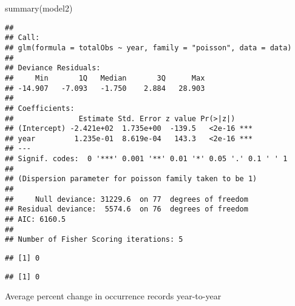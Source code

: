 \documentclass[
]{article}
\newenvironment{Shaded}{\begin{snugshade}}{\end{snugshade}}
\newcommand{\AttributeTok}[1]{\textcolor[rgb]{0.77,0.63,0.00}{#1}}
\newcommand{\FunctionTok}[1]{\textcolor[rgb]{0.00,0.00,0.00}{#1}}
\newcommand{\NormalTok}[1]{#1}
\newcommand{\SpecialCharTok}[1]{\textcolor[rgb]{0.00,0.00,0.00}{#1}}
\begin{document}
\begin{Shaded}
\begin{Highlighting}[]
\FunctionTok{summary}\NormalTok{(model2)}
\end{Highlighting}
\end{Shaded}

\begin{verbatim}
## 
## Call:
## glm(formula = totalObs ~ year, family = "poisson", data = data)
## 
## Deviance Residuals: 
##     Min       1Q   Median       3Q      Max  
## -14.907   -7.093   -1.750    2.884   28.903  
## 
## Coefficients:
##               Estimate Std. Error z value Pr(>|z|)    
## (Intercept) -2.421e+02  1.735e+00  -139.5   <2e-16 ***
## year         1.235e-01  8.619e-04   143.3   <2e-16 ***
## ---
## Signif. codes:  0 '***' 0.001 '**' 0.01 '*' 0.05 '.' 0.1 ' ' 1
## 
## (Dispersion parameter for poisson family taken to be 1)
## 
##     Null deviance: 31229.6  on 77  degrees of freedom
## Residual deviance:  5574.6  on 76  degrees of freedom
## AIC: 6160.5
## 
## Number of Fisher Scoring iterations: 5
\end{verbatim}

\begin{Shaded}
\end{Shaded}

\begin{verbatim}
## [1] 0
\end{verbatim}

\begin{Shaded}
\end{Shaded}

\begin{verbatim}
## [1] 0
\end{verbatim}

Average percent change in occurrence records year-to-year
\end{document}
